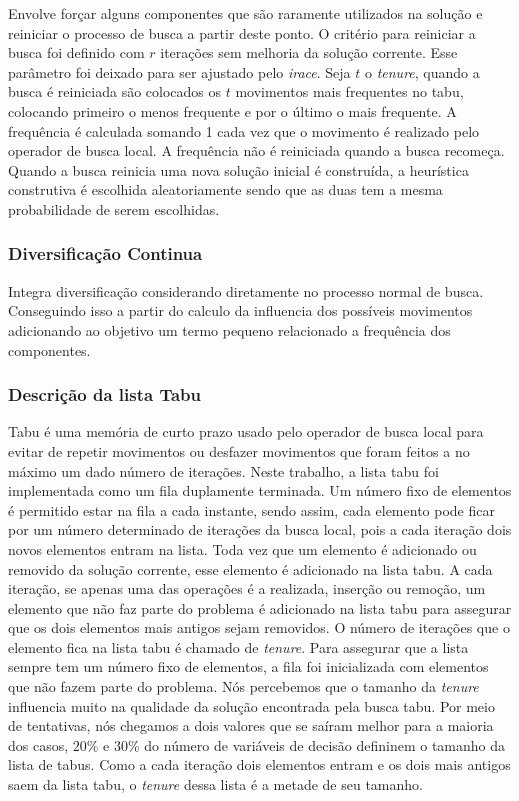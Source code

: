 \documentclass[12pt,a4paper]{article}
\begin{document}
        Envolve forçar alguns componentes que são raramente utilizados na solução e reiniciar o processo de busca a partir deste ponto. O critério para reiniciar a busca foi definido com $r$
        iterações sem melhoria da solução corrente. Esse parâmetro foi deixado para ser ajustado pelo \textit{irace}. Seja $t$ o \textit{tenure}, quando a busca é reiniciada são colocados os $t$
        movimentos mais frequentes no tabu, colocando primeiro o menos frequente e por o último o mais frequente. A frequência é calculada somando 1 cada vez que o movimento é realizado pelo
        operador de busca local. A frequência não é reiniciada quando a busca recomeça. Quando a busca reinicia uma nova solução inicial é construída, a heurística construtiva é escolhida
        aleatoriamente sendo que as duas tem a mesma probabilidade de serem escolhidas. 

    \subsubsection{Diversificação Continua}

        Integra diversificação considerando diretamente no processo normal de busca. Conseguindo isso a partir do calculo da influencia dos possíveis movimentos adicionando ao objetivo um termo pequeno
        relacionado a frequência dos componentes.

    \subsubsection{Descrição da lista Tabu}

        Tabu é uma memória de curto prazo usado pelo operador de busca local para evitar de repetir movimentos ou desfazer movimentos que foram feitos a no máximo um dado número de iterações. Neste
        trabalho, a lista tabu foi implementada como um fila duplamente terminada. Um número fixo de elementos é permitido estar na fila a cada instante, sendo assim, cada elemento pode ficar por um
        número determinado de iterações da busca local, pois a cada iteração dois novos elementos entram na lista. Toda vez que um elemento é adicionado ou removido da solução corrente, esse
        elemento é adicionado na lista tabu. A cada iteração, se apenas uma das operações é a realizada, inserção ou remoção, um elemento que não faz parte do problema é adicionado na lista tabu
        para assegurar que os dois elementos mais antigos sejam removidos. O número de iterações que o elemento fica na lista tabu é chamado de \textit{tenure}. Para assegurar que a lista sempre tem
        um número fixo de elementos, a fila foi inicializada com elementos que não fazem parte do problema. Nós percebemos que o tamanho da \textit{tenure} influencia muito na qualidade da solução
        encontrada pela busca tabu. Por meio de tentativas, nós chegamos a dois valores que se saíram melhor para a maioria dos casos, $20\%$ e $30\%$ do número de variáveis de decisão defininem o
        tamanho da lista de tabus. Como a cada iteração dois elementos entram e os dois mais antigos saem da lista tabu, o \textit{tenure} dessa lista é a metade de seu tamanho.
\end{document}
